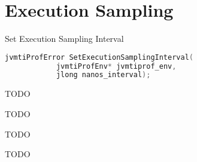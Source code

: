 
\section{Execution Sampling}

\begin{apidef}{Set Execution Sampling Interval}
\begin{lstlisting}[language=C]
jvmtiProfError SetExecutionSamplingInterval(
            jvmtiProfEnv* jvmtiprof_env,
            jlong nanos_interval);
\end{lstlisting}

\begin{apidesc}
TODO
\end{apidesc}

\begin{apiphase}
TODO
\end{apiphase}

\begin{apicap}
TODO
\end{apicap}

\begin{apiparam}
\end{apiparam}

\begin{apireturn}
TODO
\end{apireturn}

\begin{apierror}
\end{apierror}
\end{apidef}
